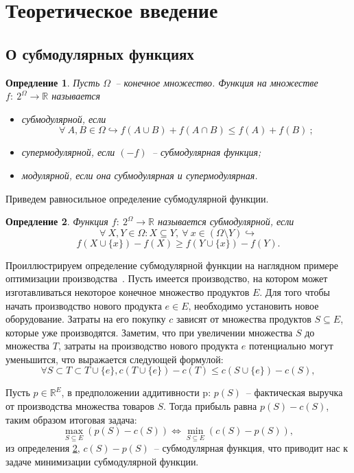 \documentclass[preprint,12pt]{elsarticle}
\newtheorem{definition}{Опредление}
\begin{document}
\section{Теоретическое введение}
\label{sec:theory}
\subsection{О субмодулярных функциях}

\begin{definition}
Пусть $\Omega$~-- конечное множество. Функция на множестве $f:~2^\Omega \rightarrow \mathbb{R}$ называется
\begin{itemize}
    \item субмодулярной, если
    \[\forall~A,B\in \Omega \hookrightarrow f(A \cup B) + f(A\cap B) \leqslant f(A)+f(B)~;\]
    \item супермодулярной, если $(-f)$~-- субмодулярная функция;
    \item модулярной, если она субмодулярная и супермодулярная.
\end{itemize}
\end{definition}
Приведем равносильное определение субмодулярной функции.
\begin{definition}
\label{subm}
Функция $f:~2^\Omega\rightarrow \mathbb{R}$ называется субмодулярной, если
\[\forall~X, Y \in \Omega: X\subseteq Y,~\forall~x \in (\Omega \setminus Y) \hookrightarrow\] \[ f(X\cup \{x\})-f(X)\geqslant f(Y\cup\{x\})-f(Y).\]
\end{definition}

Проиллюстрируем определение субмодулярной функции на наглядном примере оптимизации производства~\cite{mccormick2005submodular}. Пусть имеется производство, на котором может изготавливаться некоторое конечное множество продуктов $E$. Для того чтобы начать производство нового продукта $e \in E$, необходимо установить новое оборудование. Затраты на его покупку $c$ зависят от множества продуктов $S \subseteq E$, которые уже производятся. Заметим, что при увеличении множества $S$ до множества $T$, затраты на производство нового продукта $e$ потенциально могут уменьшится, что выражается следующей формулой:
\[\forall S \subset T \subset T \cup \{e\}, c(T\cup \{e\}) - c(T) \leq c(S \cup \{e\}) - c(S),\]

Пусть $p\in \mathbb{R}^E$, в предположении аддитивности p: $p(S)$~-- фактическая выручка от производства множества товаров $S$. Тогда прибыль равна $p(S) - c(S)$, таким образом итоговая задача:
\[
\max\limits_{S \subseteq E} (p(S) - c(S)) \Leftrightarrow \min\limits_{S \subseteq E} (c(S) - p(S)),
\]
из определения \ref{subm}, $c(S) - p(S)$~-- субмодулярная функция, что приводит нас к задаче минимизации субмодулярной функции. 
\end{document}
